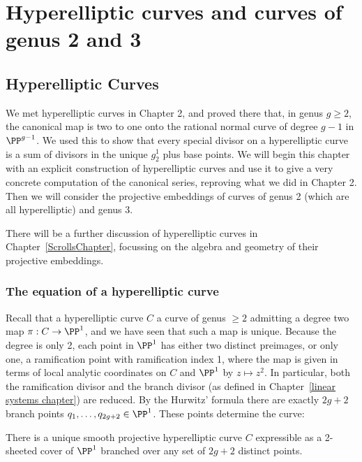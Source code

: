 

\chapter{Hyperelliptic curves and curves of genus 2 and 3}\label{genus 2 and 3 chapter}

\section{Hyperelliptic Curves}\label{hyperelliptic}
 
We met hyperelliptic curves in Chapter 2, and proved there that, in genus $g \geq 2$, the canonical
map is two to one onto the rational normal curve of degree $g-1$ in $\PP^{g-1}$. We used this to show that every special divisor on a hyperelliptic curve is a sum of divisors in the 
unique $g^1_2$ plus base points. We will begin this chapter with an explicit construction of hyperelliptic curves and use it to give a very concrete computation of the canonical series, reproving what we did in Chapter 2. Then we will consider the projective embeddings of curves of genus 2 (which are all hyperelliptic) and genus 3.
 
There will be a further discussion of hyperelliptic curves in Chapter~\ref{ScrollsChapter}, focussing on the algebra and geometry of their projective embeddings. 
  
 \subsection{The equation of a hyperelliptic curve}
 
Recall that a hyperelliptic curve $C$ a curve of genus $\geq 2$ admitting a degree two map $\pi : C \to \PP^1$, and we have seen that such a map is unique. Because the degree is only 2, each point in $\PP^1$ has either two distinct preimages, or only one, a ramification point with ramification index 1, where the map is given in terms of local analytic coordinates on $C$ and $\PP^1$ by $z \mapsto z^2$. In particular, both the ramification divisor and the branch divisor (as defined in Chapter~\ref{linear systems chapter}) are reduced. By the Hurwitz' formula there are exactly $2g+2$ branch points $q_1,\dots,q_{2g+2} \in \PP^1$. These points determine the curve:
 
\begin{theorem}\label{hyperelliptic existence}
There is a unique smooth projective hyperelliptic curve $C$ expressible as a 2-sheeted cover of $\PP^1$ branched over any set of $2g+2$ distinct points.
\end{theorem}

